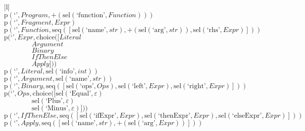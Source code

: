\footnotesize\begin{center}\begin{tabular}{|l|}\hline
{}
\\\hline
$\mathrm{p}(\text{`'},\mathit{Program},{+}\left(\mathrm{sel}\left(\text{`function'},\mathit{Function}\right)\right))$	\\
$\mathrm{p}(\text{`'},\mathit{Fragment},\mathit{Expr})$	\\
$\mathrm{p}(\text{`'},\mathit{Function},\mathrm{seq}\left(\left[\mathrm{sel}\left(\text{`name'},str\right), {+}\left(\mathrm{sel}\left(\text{`arg'},str\right)\right), \mathrm{sel}\left(\text{`rhs'},\mathit{Expr}\right)\right]\right))$	\\
$\mathrm{p}(\text{`'},\mathit{Expr},\mathrm{choice}([\mathit{Literal}$\\$\qquad\qquad\mathit{Argument}$\\$\qquad\qquad\mathit{Binary}$\\$\qquad\qquad\mathit{IfThenElse}$\\$\qquad\qquad\mathit{Apply}]))$	\\
$\mathrm{p}(\text{`'},\mathit{Literal},\mathrm{sel}\left(\text{`info'},int\right))$	\\
$\mathrm{p}(\text{`'},\mathit{Argument},\mathrm{sel}\left(\text{`name'},str\right))$	\\
$\mathrm{p}(\text{`'},\mathit{Binary},\mathrm{seq}\left(\left[\mathrm{sel}\left(\text{`ops'},\mathit{Ops}\right), \mathrm{sel}\left(\text{`left'},\mathit{Expr}\right), \mathrm{sel}\left(\text{`right'},\mathit{Expr}\right)\right]\right))$	\\
$\mathrm{p}(\text{`'},\mathit{Ops},\mathrm{choice}([\mathrm{sel}\left(\text{`Equal'},\varepsilon\right)$\\$\qquad\qquad\mathrm{sel}\left(\text{`Plus'},\varepsilon\right)$\\$\qquad\qquad\mathrm{sel}\left(\text{`Minus'},\varepsilon\right)]))$	\\
$\mathrm{p}(\text{`'},\mathit{IfThenElse},\mathrm{seq}\left(\left[\mathrm{sel}\left(\text{`ifExpr'},\mathit{Expr}\right), \mathrm{sel}\left(\text{`thenExpr'},\mathit{Expr}\right), \mathrm{sel}\left(\text{`elseExpr'},\mathit{Expr}\right)\right]\right))$	\\
$\mathrm{p}(\text{`'},\mathit{Apply},\mathrm{seq}\left(\left[\mathrm{sel}\left(\text{`name'},str\right), {+}\left(\mathrm{sel}\left(\text{`arg'},\mathit{Expr}\right)\right)\right]\right))$	\\
\hline\end{tabular}\end{center}



